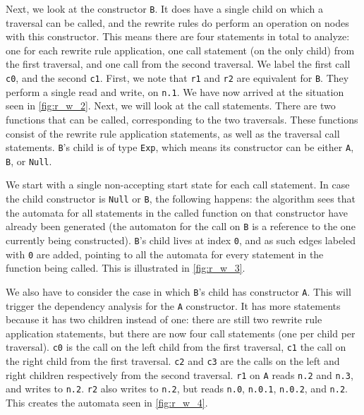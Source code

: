 Next, we look at the constructor \texttt{B}. It does have a single child on which a traversal can be called, and the rewrite rules do perform an operation on nodes with this constructor. This means there are four statements in total to analyze: one for each rewrite rule application, one call statement (on the only child) from the first traversal, and one call from the second traversal. We label the first call \texttt{c0}, and the second \texttt{c1}. First, we note that \texttt{r1} and \texttt{r2} are equivalent for \texttt{B}. They perform a single read and write, on \texttt{n.1}. We have now arrived at the situation seen in \autoref{fig:r_w_2}. Next, we will look at the call statements. There are two functions that can be called, corresponding to the two traversals. These functions consist of the rewrite rule application statements, as well as the traversal call statements. \texttt{B}'s child is of type \texttt{Exp}, which means its constructor can be either \texttt{A}, \texttt{B}, or \texttt{Null}.

We start with a single non-accepting start state for each call statement. In case the child constructor is \texttt{Null} or \texttt{B}, the following happens: the algorithm sees that the automata for all statements in the called function on that constructor have already been generated (the automaton for the call on \texttt{B} is a reference to the one currently being constructed). \texttt{B}'s child lives at index \texttt{0}, and as such edges labeled with \texttt{0} are added, pointing to all the automata for every statement in the function being called. This is illustrated in \autoref{fig:r_w_3}.

We also have to consider the case in which \texttt{B}'s child has constructor \texttt{A}. This will trigger the dependency analysis for the \texttt{A} constructor. It has more statements because it has two children instead of one: there are still two rewrite rule application statements, but there are now four call statements (one per child per traversal). \texttt{c0} is the call on the left child from the first traversal, \texttt{c1} the call on the right child from the first traversal. \texttt{c2} and \texttt{c3} are the calls on the left and right children respectively from the second traversal. \texttt{r1} on \texttt{A} reads \texttt{n.2} and \texttt{n.3}, and writes to \texttt{n.2}. \texttt{r2} also writes to \texttt{n.2}, but reads \texttt{n.0}, \texttt{n.0.1}, \texttt{n.0.2}, and \texttt{n.2}. This creates the automata seen in \autoref{fig:r_w_4}.

